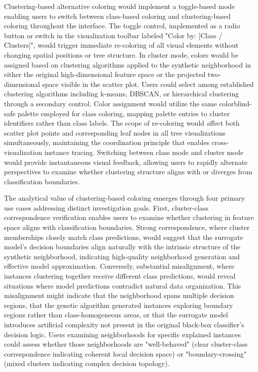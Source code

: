 Clustering-based alternative coloring would implement a toggle-based mode enabling users to switch between class-based coloring and clustering-based coloring throughout the interface. The toggle control, implemented as a radio button or switch in the visualization toolbar labeled "Color by: [Class / Clusters]", would trigger immediate re-coloring of all visual elements without changing spatial positions or tree structure. In cluster mode, colors would be assigned based on clustering algorithms applied to the synthetic neighborhood in either the original high-dimensional feature space or the projected two-dimensional space visible in the scatter plot. Users could select among established clustering algorithms including k-means, DBSCAN, or hierarchical clustering through a secondary control. Color assignment would utilize the same colorblind-safe palette employed for class coloring, mapping palette entries to cluster identifiers rather than class labels. The scope of re-coloring would affect both scatter plot points and corresponding leaf nodes in all tree visualizations simultaneously, maintaining the coordination principle that enables cross-visualization instance tracing. Switching between class mode and cluster mode would provide instantaneous visual feedback, allowing users to rapidly alternate perspectives to examine whether clustering structure aligns with or diverges from classification boundaries.

The analytical value of clustering-based coloring emerges through four primary use cases addressing distinct investigation goals. First, cluster-class correspondence verification enables users to examine whether clustering in feature space aligns with classification boundaries. Strong correspondence, where cluster memberships closely match class predictions, would suggest that the surrogate model's decision boundaries align naturally with the intrinsic structure of the synthetic neighborhood, indicating high-quality neighborhood generation and effective model approximation. Conversely, substantial misalignment, where instances clustering together receive different class predictions, would reveal situations where model predictions contradict natural data organization. This misalignment might indicate that the neighborhood spans multiple decision regions, that the genetic algorithm generated instances exploring boundary regions rather than class-homogeneous areas, or that the surrogate model introduces artificial complexity not present in the original black-box classifier's decision logic. Users examining neighborhoods for specific explained instances could assess whether those neighborhoods are "well-behaved" (clear cluster-class correspondence indicating coherent local decision space) or "boundary-crossing" (mixed clusters indicating complex decision topology).

